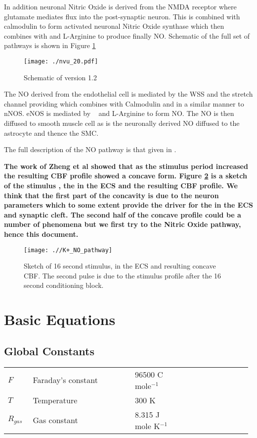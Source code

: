 \documentclass[fleqn]{report}
\numberwithin{equation}{section}
\numberwithin{equation}{section}
\newcommand{\Otwo}{\text{O$_2$}}
\newcommand{\K}{\text{K$^+$}}
\newcommand{\Ca}{\text{Ca$^{2+}$}}
\begin{document}
 
 In addition neuronal Nitric Oxide is derived from the NMDA receptor where glutamate mediates \Ca flux into the post-synaptic neuron. This \Ca is combined with calmodulin to form activated neuronal Nitric Oxide synthase which then combines with \Otwo and L-Arginine to produce finally NO.  Schematic of the full set of pathways is shown in Figure \ref{fig:nvu_FULL}
 				 \begin{figure}[h!]
 				\centering
 				\texttt{[image: ./nvu\_20.pdf]}
 				\caption{Schematic of version 1.2}
 				\label{fig:nvu_FULL}
 				\end{figure}

The NO derived from the endothelial cell is mediated by the WSS and the stretch channel providing \Ca which combines with Calmodulin and in a similar manner to nNOS. eNOS is mediated by \Otwo  ~ and L-Arginine to form NO. The NO is then diffused to smooth muscle cell  as is the neuronally derived NO diffused to the astrocyte and thence the SMC.

The full description of the NO pathway is that given in \cite{Dormanns2016b}. 

\textbf{The work of Zheng et al \cite{Zheng2010} showed that as the stimulus period increased the resulting CBF profile showed a concave form. Figure \ref{fig:K+_NO_pathway} is a sketch of the stimulus , the \K in the ECS and the resulting CBF profile. We think that the first part of the concavity is due to the neuron parameters which to some extent provide the driver for the \K in the ECS and synaptic cleft. The second half of the concave profile could be a number of phenomena but we first try to the Nitric Oxide pathway, hence this document.} 
\begin{figure}[h!]
\centering
\texttt{[image: .//K+\_NO\_pathway]}
\caption{Sketch of 16 second stimulus, \K in the ECS and resulting concave CBF. The second pulse is due to the stimulus profile after the 16 second conditioning block.}
\label{fig:K+_NO_pathway}
\end{figure}

	
\chapter{Basic Equations}
\section{\textbf{Global Constants}}\label{sec:equations}
	\begin{table}[h!]
		\centering
			\begin{tabular}{ p{0.1\linewidth}  >{\footnotesize} p{0.41\linewidth}  >{\footnotesize} p{0.20\linewidth} >{\footnotesize} p{0.27\linewidth} }
			\hline
			$ F $				& Faraday's constant 	& 96500 C mole$^{-1}$ & 	\\
			$ T $				& Temperature				& 300 K				 		&	\\
			$ R_{gas} $	  & Gas constant				& 8.315 J mole K$^{-1}$ &  	\\

			\hline
		\end{tabular}
	\end{table}
\end{document}
